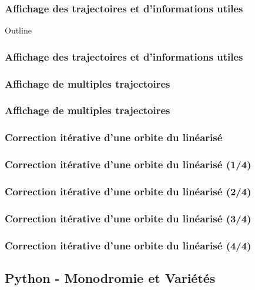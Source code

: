 \documentclass{beamer}
\begin{document}
	\subsubsection{Affichage des trajectoires et d'informations utiles}
	\begin{frame}[allowframebreaks]{Outline}
		\frametitle{Affichage des trajectoires et d'informations utiles}
		
	\end{frame}
	
	\subsubsection{Affichage de multiples trajectoires}
	\begin{frame}
	\frametitle{Affichage de multiples trajectoires}
	
	\end{frame}
	
	\subsubsection{Correction itérative d'une orbite du linéarisé}
	\label{correction iterative}
	\begin{frame}
		\frametitle{Correction itérative d'une orbite du linéarisé (1/4)}
		
	\end{frame}
	
	\begin{frame}
		\frametitle{Correction itérative d'une orbite du linéarisé (2/4)}
		
	\end{frame}
	
	\begin{frame}
		\frametitle{Correction itérative d'une orbite du linéarisé (3/4)}
		
	\end{frame}
	
	\begin{frame}
		\frametitle{Correction itérative d'une orbite du linéarisé (4/4)}
		
	\end{frame}
	
	
	\subsection{Python - Monodromie et Variétés}
	
\end{document}
